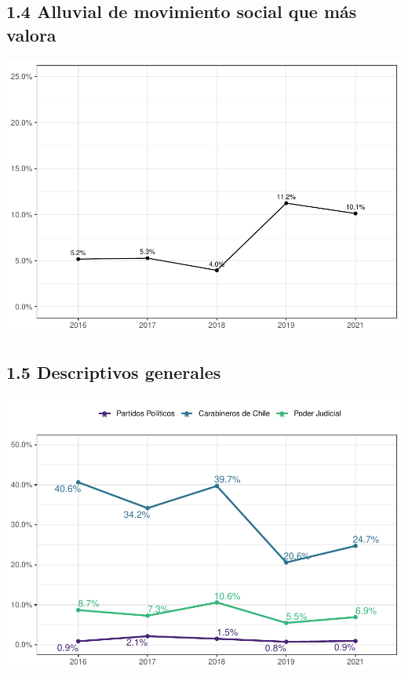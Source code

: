 \documentclass[
  12pt,
  openany]{book}
\begin{document}
\hypertarget{alluvial-de-movimiento-social-que-muxe1s-valora}{%
\subsection{1.4 Alluvial de movimiento social que más valora}\label{alluvial-de-movimiento-social-que-muxe1s-valora}}

\includegraphics{reporte-elsoc_files/figure-latex/unnamed-chunk-13-1.pdf}

\hypertarget{descriptivos-generales}{%
\subsection{1.5 Descriptivos generales}\label{descriptivos-generales}}

\includegraphics{reporte-elsoc_files/figure-latex/unnamed-chunk-15-1.pdf}
\end{document}
